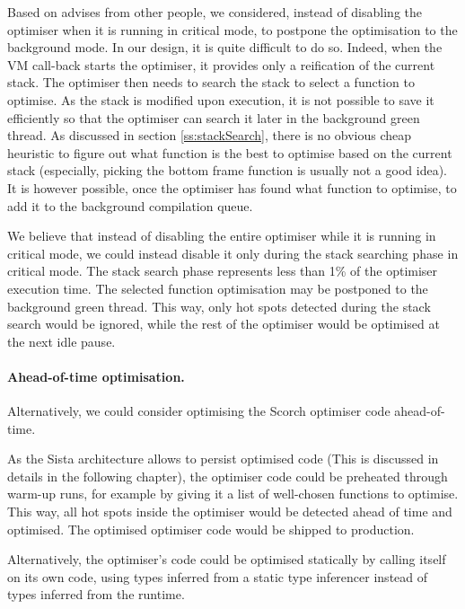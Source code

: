 \documentclass[a4paper,12pt,twoside]{../includes/ThesisStyle}
\begin{document}
Based on advises from other people, we considered, instead of disabling the optimiser when it is running in critical mode, to postpone the optimisation to the background mode. In our design, it is quite difficult to do so. Indeed, when the VM call-back starts the optimiser, it provides only a reification of the current stack. The optimiser then needs to search the stack to select a function to optimise. As the stack is modified upon execution, it is not possible to save it efficiently so that the optimiser can search it later in the background green thread. As discussed in section \ref{ss:stackSearch}, there is no obvious cheap heuristic to figure out what function is the best to optimise based on the current stack (especially, picking the bottom frame function is usually not a good idea). It is however possible, once the optimiser has found what function to optimise, to add it to the background compilation queue. 

We believe that instead of disabling the entire optimiser while it is running in critical mode, we could instead disable it only during the stack searching phase in critical mode. The stack search phase represents less than 1\% of the optimiser execution time. The selected function optimisation may be postponed to the background green thread. This way, only hot spots detected during the stack search would be ignored, while the rest of the optimiser would be optimised at the next idle pause.

\paragraph{Ahead-of-time optimisation.} 
Alternatively, we could consider optimising the Scorch optimiser code ahead-of-time.

As the Sista architecture allows to persist optimised code (This is discussed in details in the following chapter), the optimiser code could be preheated through warm-up runs, for example by giving it a list of well-chosen functions to optimise. This way, all hot spots inside the optimiser would be detected ahead of time and optimised. The optimised optimiser code would be shipped to production.

Alternatively, the optimiser's code could be optimised statically by calling itself on its own code, using types inferred from a static type inferencer instead of types inferred from the runtime.

\end{document}
